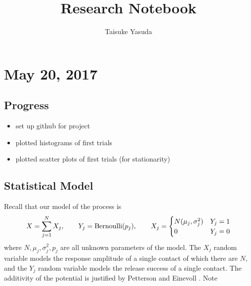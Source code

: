 \documentclass{article}
\title{Research Notebook}
\author{Taisuke Yasuda}
\begin{document}
\maketitle
\tableofcontents
\newpage

\section{May 20, 2017}
\subsection{Progress}
\begin{itemize}
  \item set up github for project
  \item plotted histograms of first trials
  \item plotted scatter plots of first trials (for stationarity)
\end{itemize}

\subsection{Statistical Model}
Recall that our model of the process is
\[
  X = \sum_{j=1}^N X_j,\qquad Y_j = \operatorname{Bernoulli}(p_j),\qquad X_j =
  \begin{cases}
    N(\mu_j,\sigma_j^2) & Y_j = 1 \\
    0 & Y_j = 0
  \end{cases}
\]
where $N, \mu_j, \sigma_j^2, p_j$ are all unknown parameters of the model. The $X_j$ random variable models the response amplitude of a single contact of which there are $N$, and the $Y_j$ random variable models the release success of a single contact. The additivity of the potential is justified by Petterson and Einevoll \cite{pettersen2008amplitude}. Note



\end{document}
